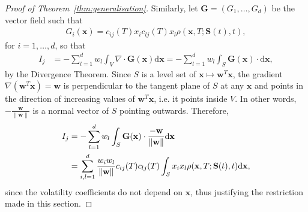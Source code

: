 \documentclass[english]{article}
\numberwithin{equation}{section}
\numberwithin{figure}{section}
\theoremstyle{bolddescit}
\theoremstyle{definition}
\theoremstyle{definition}
\theoremstyle{plain}
\theoremstyle{plain}
\theoremstyle{bolddesc}
\theoremstyle{plain}
\theoremstyle{remark}
\begin{document}
\begin{proof}[Proof of Theorem~\ref{thm:generalisation}]
  Similarly, let $\mathbf{G} = (G_1,\ldots,G_d)$ be the vector field such that
  \begin{align*}
    G_i(\mathbf{x}) = c_{ij}(T) x_i c_{lj}(T) x_l \rho(\mathbf{x},T;\mathbf{S}(t),t),
  \end{align*}
  for $i=1,\ldots,d$, so that
  \begin{align*}
    I_j
    &= - \sum_{l=1}^{d} w_l \int_V \nabla \cdot \mathbf{G}(\mathbf{x}) \mathrm{d}\mathbf{x}
    = - \sum_{l=1}^{d} w_l \int_S \mathbf{G}(\mathbf{x}) \cdot \mathrm{d}\mathbf{x},
  \end{align*}
  by the Divergence Theorem. Since $S$ is a level set of $\mathbf{x} \mapsto \mathbf{w}^T \mathbf{x}$, the gradient $\nabla (\mathbf{w}^T \mathbf{x}) = \mathbf{w}$ is perpendicular to the tangent plane of $S$ at any $\mathbf{x}$ and points in the direction of increasing values of $\mathbf{w}^T \mathbf{x}$, i.e. it points inside $V$. In other words, $- \frac{\mathbf{w}}{\|\mathbf{w}\|}$ is a normal vector of $S$ pointing outwards. Therefore,
  \begin{align}
    I_j
    &= - \sum_{l=1}^{d} w_l \int_S \mathbf{G}(\mathbf{x}) \cdot \frac{-\mathbf{w}}{\|\mathbf{w}\|} \mathrm{d}\mathbf{x}\notag\\
    &= \sum_{i,l=1}^{d} \frac{w_i w_l}{\|\mathbf{w}\|} c_{ij}(T) c_{lj}(T) \int_S x_i x_l \rho(\mathbf{x},T;\mathbf{S}(t),t) \mathrm{d}\mathbf{x},\label{eq:generalisation-Ij}
  \end{align}
  since the volatility coefficients do not depend on $\mathbf{x}$, thus justifying the restriction made in this section.


\end{proof}
\end{document}
